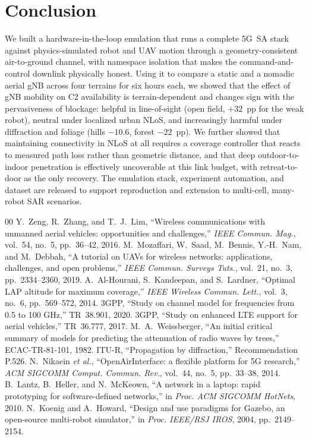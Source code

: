 \documentclass[conference]{IEEEtran}
\begin{document}
\section{Conclusion}
\label{sec:conclusion}
We built a hardware-in-the-loop emulation that runs a complete 5G~SA stack against
physics-simulated robot and UAV motion through a geometry-consistent air-to-ground
channel, with namespace isolation that makes the command-and-control downlink
physically honest. Using it to compare a static and a nomadic aerial gNB across
four terrains for six hours each, we showed that the effect of gNB mobility on C2
availability is terrain-dependent and changes sign with the pervasiveness of
blockage: helpful in line-of-sight (open field, $+32$~pp for the weak robot),
neutral under localized urban NLoS, and increasingly harmful under diffraction and
foliage (hills $-10.6$, forest $-22$~pp). We further showed that maintaining
connectivity in NLoS at all requires a coverage controller that reacts to measured
path loss rather than geometric distance, and that deep outdoor-to-indoor
penetration is effectively uncoverable at this link budget, with retreat-to-door
as the only recovery. The emulation stack, experiment automation, and dataset are
released to support reproduction and extension to multi-cell, many-robot SAR
scenarios.

\begin{thebibliography}{00}
 Y.~Zeng, R.~Zhang, and T.~J.~Lim, ``Wireless
communications with unmanned aerial vehicles: opportunities and challenges,''
\emph{IEEE Commun. Mag.}, vol.~54, no.~5, pp.~36--42, 2016.
 M.~Mozaffari, W.~Saad, M.~Bennis, Y.-H.~Nam, and
M.~Debbah, ``A tutorial on UAVs for wireless networks: applications, challenges,
and open problems,'' \emph{IEEE Commun. Surveys Tuts.}, vol.~21, no.~3,
pp.~2334--2360, 2019.
 A.~Al-Hourani, S.~Kandeepan, and S.~Lardner,
``Optimal LAP altitude for maximum coverage,'' \emph{IEEE Wireless Commun. Lett.},
vol.~3, no.~6, pp.~569--572, 2014.
 3GPP, ``Study on channel model for frequencies from 0.5 to
100 GHz,'' TR~38.901, 2020.
 3GPP, ``Study on enhanced LTE support for aerial vehicles,''
TR~36.777, 2017.
 M.~A.~Weissberger, ``An initial critical summary of
models for predicting the attenuation of radio waves by trees,'' ECAC-TR-81-101,
1982.
 ITU-R, ``Propagation by diffraction,'' Recommendation P.526.
 N.~Nikaein \emph{et al.}, ``OpenAirInterface: a flexible
platform for 5G research,'' \emph{ACM SIGCOMM Comput. Commun. Rev.}, vol.~44,
no.~5, pp.~33--38, 2014.
 B.~Lantz, B.~Heller, and N.~McKeown, ``A network in a
laptop: rapid prototyping for software-defined networks,'' in \emph{Proc. ACM
SIGCOMM HotNets}, 2010.
 N.~Koenig and A.~Howard, ``Design and use paradigms for
Gazebo, an open-source multi-robot simulator,'' in \emph{Proc. IEEE/RSJ IROS},
2004, pp.~2149--2154.
\end{thebibliography}
\end{document}

